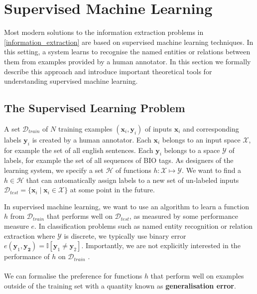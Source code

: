\section{Supervised Machine Learning}
\label{supervised_machine_learning}

Most modern solutions to the information extraction problems in \ref{information_extraction} are based on supervised machine learning techniques. In this setting, a system learns to recognise the named entities or relations between them from examples provided by a human annotator. In this section we formally describe this approach and introduce important theoretical tools for understanding supervised machine learning.

\subsection{The Supervised Learning Problem}
\label{the_supervised_learning_problem}
A set $\mathcal{D}_{train}$ of $N$ training examples $(\mathbf{x}_i, \mathbf{y}_i)$ of inputs $\mathbf{x}_i$ and corresponding labels $\mathbf{y}_i$ is created by a human annotator. Each $\mathbf{x}_i$ belongs to an input space $\mathcal{X}$, for example the set of all english sentences. Each $\mathbf{y}_i$ belongs to a space $\mathcal{Y}$ of labels, for example the set of all sequences of BIO tags. As designers of the learning system, we specify a set $\mathcal{H}$ of functions $h: \mathcal{X} \mapsto \mathcal{Y}$. We want to find a $h \in \mathcal{H}$ that can automatically assign labels to a new set of un-labeled inputs $\mathcal{D}_{test} = \{ \mathbf{x}_i \mid \mathbf{x}_i \in \mathcal{X}\}$ at some point in the future. 

In supervised machine learning, we want to use an algorithm to learn a function $h$ from $\mathcal{D}_{train}$ that performs well on $\mathcal{D}_{test}$, as measured by some performance measure $e$. In classification problems such as named entity recognition or relation extraction where $\mathcal{Y}$ is discrete, we typically use binary error $e(\mathbf{y}_1, \mathbf{y_2}) = \mathbb{I}[\mathbf{y}_1 \neq \mathbf{y}_2]$. Importantly, we are not explicitly interested in the performance of $h$ on $\mathcal{D}_{train}$ \citep{yaser12}.
\\\\
We can formalise the preference for functions $h$ that perform well on examples outside of the training set with a quantity known as \textbf{generalisation error}.

